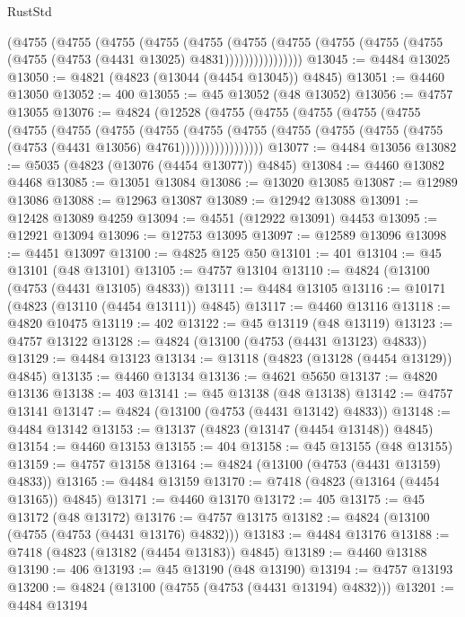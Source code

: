 \begin{lexlean}{RustStd}
\begin{coremodule}
            (@4755
              (@4755
                (@4755
                  (@4755
                    (@4755
                      (@4755
                        (@4755
                          (@4755 (@4755 (@4755 (@4755 (@4753 (@4431 @13025) @4831))))))))))))))))
@13045 := @4484 @13025
@13050 := @4821 (@4823 (@13044 (@4454 @13045)) @4845)
@13051 := @4460 @13050
@13052 := 400
@13055 := @45 @13052 (@48 @13052)
@13056 := @4757 @13055
@13076 := @4824
    (@12528
      (@4755
        (@4755
          (@4755
            (@4755
              (@4755
                (@4755
                  (@4755
                    (@4755
                      (@4755
                        (@4755
                          (@4755
                            (@4755 (@4755 (@4755 (@4755 (@4753 (@4431 @13056) @4761)))))))))))))))))
@13077 := @4484 @13056
@13082 := @5035 (@4823 (@13076 (@4454 @13077)) @4845)
@13084 := @4460 @13082 @4468
@13085 := @13051 @13084
@13086 := @13020 @13085
@13087 := @12989 @13086
@13088 := @12963 @13087
@13089 := @12942 @13088
@13091 := @12428 @13089 @4259
@13094 := @4551 (@12922 @13091) @4453
@13095 := @12921 @13094
@13096 := @12753 @13095
@13097 := @12589 @13096
@13098 := @4451 @13097
@13100 := @4825 @125 @50
@13101 := 401
@13104 := @45 @13101 (@48 @13101)
@13105 := @4757 @13104
@13110 := @4824 (@13100 (@4753 (@4431 @13105) @4833))
@13111 := @4484 @13105
@13116 := @10171 (@4823 (@13110 (@4454 @13111)) @4845)
@13117 := @4460 @13116
@13118 := @4820 @10475
@13119 := 402
@13122 := @45 @13119 (@48 @13119)
@13123 := @4757 @13122
@13128 := @4824 (@13100 (@4753 (@4431 @13123) @4833))
@13129 := @4484 @13123
@13134 := @13118 (@4823 (@13128 (@4454 @13129)) @4845)
@13135 := @4460 @13134
@13136 := @4621 @5650
@13137 := @4820 @13136
@13138 := 403
@13141 := @45 @13138 (@48 @13138)
@13142 := @4757 @13141
@13147 := @4824 (@13100 (@4753 (@4431 @13142) @4833))
@13148 := @4484 @13142
@13153 := @13137 (@4823 (@13147 (@4454 @13148)) @4845)
@13154 := @4460 @13153
@13155 := 404
@13158 := @45 @13155 (@48 @13155)
@13159 := @4757 @13158
@13164 := @4824 (@13100 (@4753 (@4431 @13159) @4833))
@13165 := @4484 @13159
@13170 := @7418 (@4823 (@13164 (@4454 @13165)) @4845)
@13171 := @4460 @13170
@13172 := 405
@13175 := @45 @13172 (@48 @13172)
@13176 := @4757 @13175
@13182 := @4824 (@13100 (@4755 (@4753 (@4431 @13176) @4832)))
@13183 := @4484 @13176
@13188 := @7418 (@4823 (@13182 (@4454 @13183)) @4845)
@13189 := @4460 @13188
@13190 := 406
@13193 := @45 @13190 (@48 @13190)
@13194 := @4757 @13193
@13200 := @4824 (@13100 (@4755 (@4753 (@4431 @13194) @4832)))
@13201 := @4484 @13194

\end{coremodule}
\end{lexlean}
